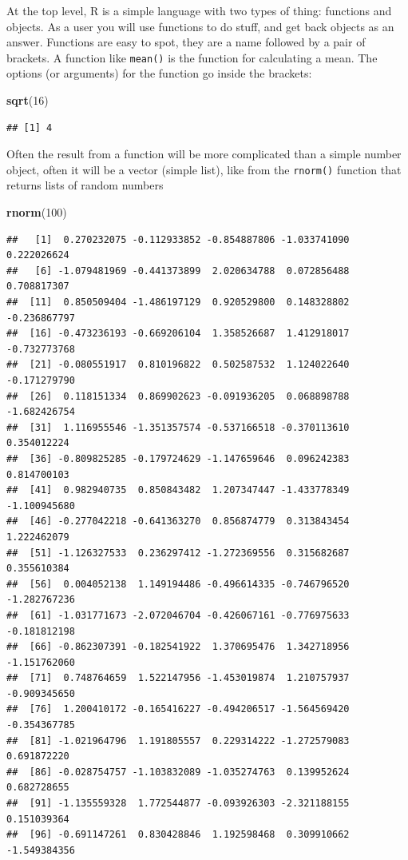 \documentclass[
]{book}
\newenvironment{Shaded}{\begin{snugshade}}{\end{snugshade}}
\newcommand{\DecValTok}[1]{\textcolor[rgb]{0.00,0.00,0.81}{#1}}
\newcommand{\KeywordTok}[1]{\textcolor[rgb]{0.13,0.29,0.53}{\textbf{#1}}}
\newcommand{\NormalTok}[1]{#1}
\begin{document}
At the top level, R is a simple language with two types of thing: functions and objects. As a user you will use functions to do stuff, and get back objects as an answer. Functions are easy to spot, they are a name followed by a pair of brackets. A function like \texttt{mean()} is the function for calculating a mean. The options (or arguments) for the function go inside the brackets:

\begin{Shaded}
\begin{Highlighting}[]
\KeywordTok{sqrt}\NormalTok{(}\DecValTok{16}\NormalTok{)}
\end{Highlighting}
\end{Shaded}

\begin{verbatim}
## [1] 4
\end{verbatim}

Often the result from a function will be more complicated than a simple number object, often it will be a vector (simple list), like from the \texttt{rnorm()} function that returns lists of random numbers

\begin{Shaded}
\begin{Highlighting}[]
\KeywordTok{rnorm}\NormalTok{(}\DecValTok{100}\NormalTok{)}
\end{Highlighting}
\end{Shaded}

\begin{verbatim}
##   [1]  0.270232075 -0.112933852 -0.854887806 -1.033741090  0.222026624
##   [6] -1.079481969 -0.441373899  2.020634788  0.072856488  0.708817307
##  [11]  0.850509404 -1.486197129  0.920529800  0.148328802 -0.236867797
##  [16] -0.473236193 -0.669206104  1.358526687  1.412918017 -0.732773768
##  [21] -0.080551917  0.810196822  0.502587532  1.124022640 -0.171279790
##  [26]  0.118151334  0.869902623 -0.091936205  0.068898788 -1.682426754
##  [31]  1.116955546 -1.351357574 -0.537166518 -0.370113610  0.354012224
##  [36] -0.809825285 -0.179724629 -1.147659646  0.096242383  0.814700103
##  [41]  0.982940735  0.850843482  1.207347447 -1.433778349 -1.100945680
##  [46] -0.277042218 -0.641363270  0.856874779  0.313843454  1.222462079
##  [51] -1.126327533  0.236297412 -1.272369556  0.315682687  0.355610384
##  [56]  0.004052138  1.149194486 -0.496614335 -0.746796520 -1.282767236
##  [61] -1.031771673 -2.072046704 -0.426067161 -0.776975633 -0.181812198
##  [66] -0.862307391 -0.182541922  1.370695476  1.342718956 -1.151762060
##  [71]  0.748764659  1.522147956 -1.453019874  1.210757937 -0.909345650
##  [76]  1.200410172 -0.165416227 -0.494206517 -1.564569420 -0.354367785
##  [81] -1.021964796  1.191805557  0.229314222 -1.272579083  0.691872220
##  [86] -0.028754757 -1.103832089 -1.035274763  0.139952624  0.682728655
##  [91] -1.135559328  1.772544877 -0.093926303 -2.321188155  0.151039364
##  [96] -0.691147261  0.830428846  1.192598468  0.309910662 -1.549384356
\end{verbatim}
\end{document}
